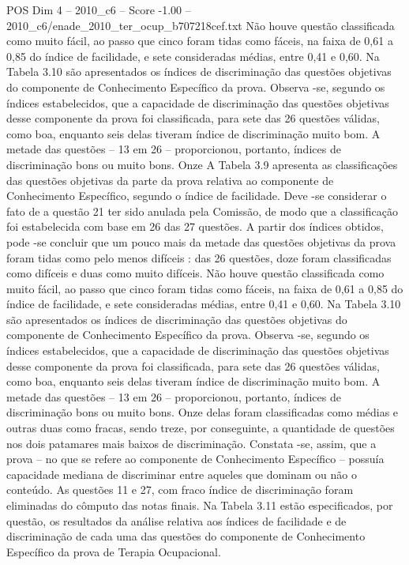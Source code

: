 \begin{textsample}{POS Dim 4 – 2010\_c6 – Score -1.00 – 2010\_c6/enade\_2010\_ter\_ocup\_b707218cef.txt}
Não houve questão classificada como muito fácil, ao passo que cinco foram tidas como fáceis, na faixa de 0,61 a 0,85 do índice de facilidade, e sete consideradas médias, entre 0,41 e 0,60.
Na Tabela 3.10 são apresentados os índices de discriminação das questões objetivas do componente de Conhecimento Específico da prova.
Observa -se, segundo os índices estabelecidos, que a capacidade de discriminação das questões objetivas desse componente da prova foi classificada, para sete das 26 questões válidas, como boa, enquanto seis delas tiveram índice de discriminação muito bom.
A metade das questões – 13 em 26 – proporcionou, portanto, índices de discriminação bons ou muito bons.
Onze A Tabela 3.9 apresenta as classificações das questões objetivas da parte da prova relativa ao componente de Conhecimento Específico, segundo o índice de facilidade.
Deve -se considerar o fato de a questão 21 ter sido anulada pela Comissão, de modo que a classificação foi estabelecida com base em 26 das 27 questões.
A partir dos índices obtidos, pode -se concluir que um pouco mais da metade das questões objetivas da prova foram tidas como pelo menos difíceis : das 26 questões, doze foram classificadas como difíceis e duas como muito difíceis.
Não houve questão classificada como muito fácil, ao passo que cinco foram tidas como fáceis, na faixa de 0,61 a 0,85 do índice de facilidade, e sete consideradas médias, entre 0,41 e 0,60.
Na Tabela 3.10 são apresentados os índices de discriminação das questões objetivas do componente de Conhecimento Específico da prova.
Observa -se, segundo os índices estabelecidos, que a capacidade de discriminação das questões objetivas desse componente da prova foi classificada, para sete das 26 questões válidas, como boa, enquanto seis delas tiveram índice de discriminação muito bom.
A metade das questões – 13 em 26 – proporcionou, portanto, índices de discriminação bons ou muito bons.
Onze delas foram classificadas como médias e outras duas como fracas, sendo treze, por conseguinte, a quantidade de questões nos dois patamares mais baixos de discriminação.
Constata -se, assim, que a prova – no que se refere ao componente de Conhecimento Específico – possuía capacidade mediana de discriminar entre aqueles que dominam ou não o conteúdo.
As questões 11 e 27, com fraco índice de discriminação foram eliminadas do cômputo das notas finais.
Na Tabela 3.11 estão especificados, por questão, os resultados da análise relativa aos índices de facilidade e de discriminação de cada uma das questões do componente de Conhecimento Específico da prova de Terapia Ocupacional.

\end{textsample}
